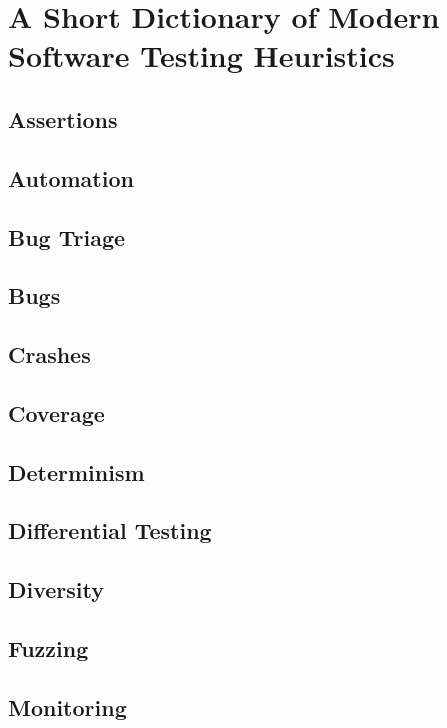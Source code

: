 \chapter{A Short Dictionary of Modern Software Testing Heuristics}

\section{Assertions}

\section{Automation}

\section{Bug Triage}

\section{Bugs}

\section{Crashes}

\section{Coverage}

\section{Determinism}

\section{Differential Testing}

\section{Diversity}

\section{Fuzzing}

\section{Monitoring}

